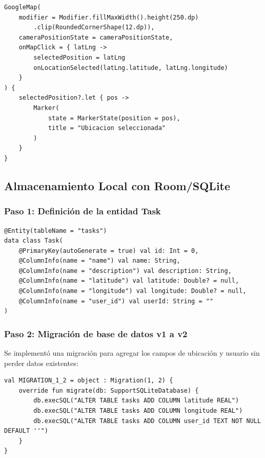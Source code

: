 \documentclass[12pt,a4paper]{article}
\begin{document}
\begin{lstlisting}[caption={Mapa interactivo con selección por toque}]
GoogleMap(
    modifier = Modifier.fillMaxWidth().height(250.dp)
        .clip(RoundedCornerShape(12.dp)),
    cameraPositionState = cameraPositionState,
    onMapClick = { latLng ->
        selectedPosition = latLng
        onLocationSelected(latLng.latitude, latLng.longitude)
    }
) {
    selectedPosition?.let { pos ->
        Marker(
            state = MarkerState(position = pos),
            title = "Ubicacion seleccionada"
        )
    }
}
\end{lstlisting}

\subsection{Almacenamiento Local con Room/SQLite}

\subsubsection{Paso 1: Definición de la entidad Task}

\begin{lstlisting}[caption={Entidad Task con campos de ubicación y usuario}]
@Entity(tableName = "tasks")
data class Task(
    @PrimaryKey(autoGenerate = true) val id: Int = 0,
    @ColumnInfo(name = "name") val name: String,
    @ColumnInfo(name = "description") val description: String,
    @ColumnInfo(name = "latitude") val latitude: Double? = null,
    @ColumnInfo(name = "longitude") val longitude: Double? = null,
    @ColumnInfo(name = "user_id") val userId: String = ""
)
\end{lstlisting}

\subsubsection{Paso 2: Migración de base de datos v1 a v2}

Se implementó una migración para agregar los campos de ubicación y usuario sin perder datos existentes:

\begin{lstlisting}[caption={Migración Room v1 a v2}]
val MIGRATION_1_2 = object : Migration(1, 2) {
    override fun migrate(db: SupportSQLiteDatabase) {
        db.execSQL("ALTER TABLE tasks ADD COLUMN latitude REAL")
        db.execSQL("ALTER TABLE tasks ADD COLUMN longitude REAL")
        db.execSQL("ALTER TABLE tasks ADD COLUMN user_id TEXT NOT NULL DEFAULT ''")
    }
}
\end{lstlisting}
\end{document}
